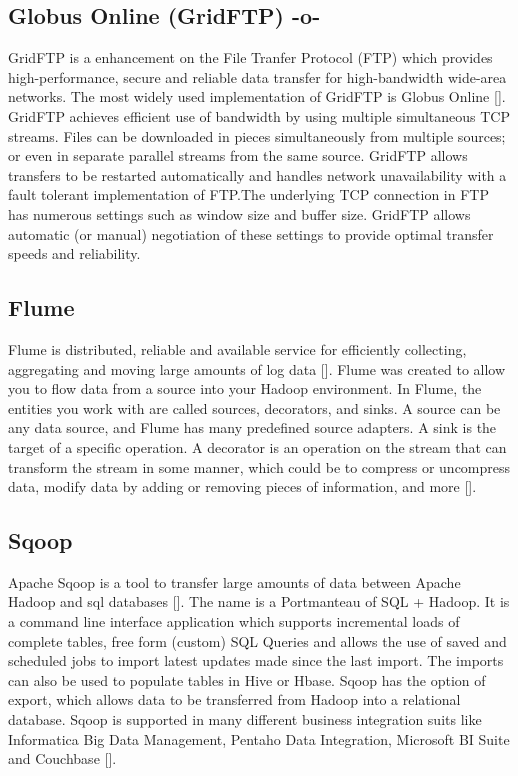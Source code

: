 \subsection{Globus Online (GridFTP) -o-}

GridFTP is a enhancement on the File Tranfer Protocol (FTP) which
provides high-performance, secure and reliable data transfer for
high-bandwidth wide-area networks. The most widely used implementation
of GridFTP is Globus Online [\cite{www-GlobusOnline}]. GridFTP achieves
efficient use of bandwidth by using multiple simultaneous TCP streams.
Files can be downloaded in pieces simultaneously from multiple
sources; or even in separate parallel streams from the same
source. GridFTP allows transfers to be restarted automatically and
handles network unavailability with a fault tolerant implementation of
FTP.The underlying TCP connection in FTP has numerous settings such as
window size and buffer size. GridFTP allows automatic (or manual)
negotiation of these settings to provide optimal transfer speeds and
reliability.




\subsection{Flume}

Flume is distributed, reliable and available service for efficiently
collecting, aggregating and moving large amounts of log
data [\cite{apache-flume}]. Flume was created to allow you to flow data
from a source into your Hadoop environment.  In Flume, the entities
you work with are called sources, decorators, and sinks. A source can
be any data source, and Flume has many predefined source adapters. A
sink is the target of a specific operation. A decorator is an
operation on the stream that can transform the stream in some manner,
which could be to compress or uncompress data, modify data by adding
or removing pieces of information, and more [\cite{ibm-flume}].

\subsection{Sqoop}
     
Apache Sqoop is a tool to transfer large amounts of data between
Apache Hadoop and sql databases [\cite{www-sqoop}]. The name is a
Portmanteau of SQL + Hadoop. It is a command line interface
application which supports incremental loads of complete tables, free
form (custom) SQL Queries and allows the use of saved and scheduled
jobs to import latest updates made since the last import. The imports
can also be used to populate tables in Hive or Hbase. Sqoop has the
option of export, which allows data to be transferred from Hadoop into
a relational database. Sqoop is supported in many different business
integration suits like Informatica Big Data Management, Pentaho Data
Integration, Microsoft BI Suite and Couchbase [\cite{sqoop-wiki}].

